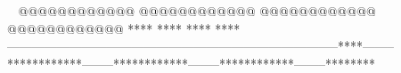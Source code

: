     @@@@@@@@@@@@        @@@@@@@@@@@@        @@@@@@@@@@@@        @@@@@@@@@@@@            ****                ****                ****                ****        --------------------------------------------------------------------------------****--------************--------************--------************--------********                                                                                 